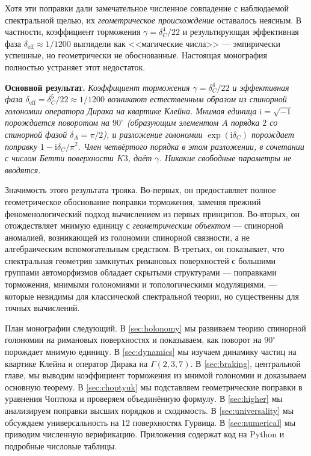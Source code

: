 \documentclass[12pt,a4paper]{article}
\theoremstyle{definition}
\theoremstyle{remark}
\newcommand{\ii}{\mathrm{i}}
\begin{document}
Хотя эти поправки дали замечательное численное совпадение с наблюдаемой спектральной щелью, их \emph{геометрическое происхождение} оставалось неясным. В частности, коэффициент торможения $\gamma = \delta_C^4/22$ и результирующая эффективная фаза $\delta_{\mathrm{eff}} \approx 1/1200$ выглядели как <<магические числа>> --- эмпирически успешные, но геометрически не обоснованные. Настоящая монография полностью устраняет этот недостаток.

\medskip

\noindent\textbf{Основной результат.} \emph{Коэффициент торможения $\gamma = \delta_C^4/22$ и эффективная фаза $\delta_{\mathrm{eff}} = \delta_C^5/22 \approx 1/1200$ возникают естественным образом из спинорной голономии оператора Дирака на квартике Клейна. Мнимая единица $\ii = \sqrt{-1}$ порождается поворотом на $90^\circ$ (образующим элементом $A$ порядка $2$ со спинорной фазой $\delta_A = \pi/2$), и разложение голономии $\exp(\ii\delta_C)$ порождает поправку $1 - \ii\delta_C/\pi^2$. Член четвёртого порядка в этом разложении, в сочетании с числом Бетти поверхности $K3$, даёт $\gamma$. Никакие свободные параметры не вводятся.}

Значимость этого результата трояка. Во-первых, он предоставляет полное геометрическое обоснование поправки торможения, заменяя прежний феноменологический подход вычислением из первых принципов. Во-вторых, он отождествляет мнимую единицу с \emph{геометрическим объектом} --- спинорной аномалией, возникающей из голономии спинорной связности, а не алгебраическим вспомогательным средством. В-третьих, он показывает, что спектральная геометрия замкнутых римановых поверхностей с большими группами автоморфизмов обладает скрытыми структурами --- поправками торможения, мнимыми голономиями и топологическими модуляциями, --- которые невидимы для классической спектральной теории, но существенны для точных вычислений.

План монографии следующий. В \cref{sec:holonomy} мы развиваем теорию спинорной голономии на римановых поверхностях и показываем, как поворот на $90^\circ$ порождает мнимую единицу. В \cref{sec:dynamics} мы изучаем динамику частиц на квартике Клейна и оператор Дирака на $\Gamma(2,3,7)$. В \cref{sec:braking}, центральной главе, мы выводим коэффициент торможения из мнимой голономии и доказываем основную теорему. В \cref{sec:choptyuk} мы подставляем геометрические поправки в уравнения Чоптюка и проверяем объединённую формулу. В \cref{sec:higher} мы анализируем поправки высших порядков и сходимость. В \cref{sec:universality} мы обсуждаем универсальность на 12 поверхностях Гурвица. В \cref{sec:numerical} мы приводим численную верификацию. Приложения содержат код на Python и подробные числовые таблицы.
\end{document}
